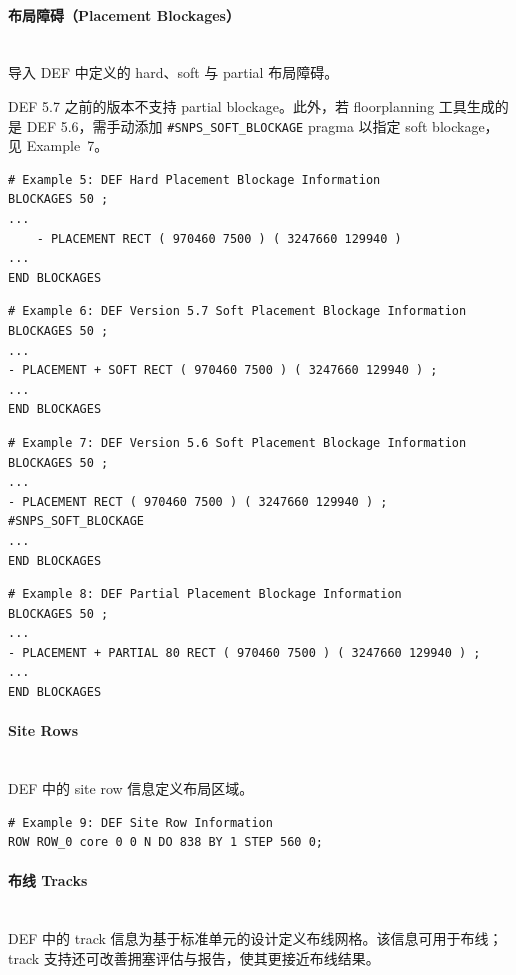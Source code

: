 \paragraph{布局障碍（Placement Blockages）}\mbox{}\\
 导入 DEF 中定义的 hard、soft 与 partial 布局障碍。

\begin{noteBox}
DEF 5.7 之前的版本不支持 partial blockage。此外，若 floorplanning 工具生成的是 DEF 5.6，需手动添加 \texttt{\#SNPS\_SOFT\_BLOCKAGE} pragma 以指定 soft blockage，见 Example~7。
\end{noteBox}

\begin{lstlisting}
# Example 5: DEF Hard Placement Blockage Information
BLOCKAGES 50 ;
...
    - PLACEMENT RECT ( 970460 7500 ) ( 3247660 129940 )
...
END BLOCKAGES
\end{lstlisting}

\begin{lstlisting}
# Example 6: DEF Version 5.7 Soft Placement Blockage Information
BLOCKAGES 50 ;
...
- PLACEMENT + SOFT RECT ( 970460 7500 ) ( 3247660 129940 ) ;
...
END BLOCKAGES
\end{lstlisting}

\begin{lstlisting}
# Example 7: DEF Version 5.6 Soft Placement Blockage Information
BLOCKAGES 50 ;
...
- PLACEMENT RECT ( 970460 7500 ) ( 3247660 129940 ) ; #SNPS_SOFT_BLOCKAGE
...
END BLOCKAGES
\end{lstlisting}

\begin{lstlisting}
# Example 8: DEF Partial Placement Blockage Information
BLOCKAGES 50 ;
...
- PLACEMENT + PARTIAL 80 RECT ( 970460 7500 ) ( 3247660 129940 ) ;
...
END BLOCKAGES
\end{lstlisting}

\paragraph{Site Rows}\mbox{}\\
DEF 中的 site row 信息定义布局区域。

\begin{lstlisting}
# Example 9: DEF Site Row Information
ROW ROW_0 core 0 0 N DO 838 BY 1 STEP 560 0;
\end{lstlisting}

\paragraph{布线 Tracks}\mbox{}\\
DEF 中的 track 信息为基于标准单元的设计定义布线网格。该信息可用于布线；track 支持还可改善拥塞评估与报告，使其更接近布线结果。

